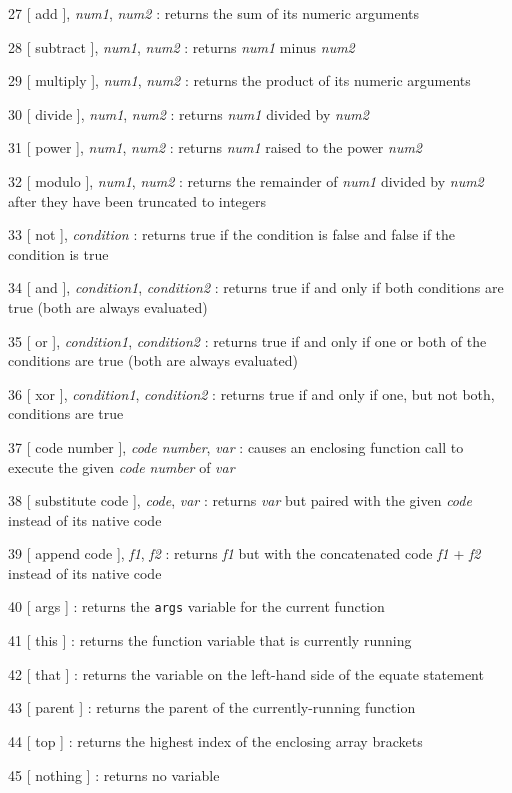 \documentclass{article}
\begin{document}
\begin{description}
\item{27  [ add ], \emph{num1}, \emph{num2}} : returns the sum of its numeric arguments
\item{28  [ subtract ], \emph{num1}, \emph{num2}} : returns \emph{num1} minus \emph{num2}
\item{29  [ multiply ], \emph{num1}, \emph{num2}} : returns the product of its numeric arguments
\item{30  [ divide ], \emph{num1}, \emph{num2}} : returns \emph{num1} divided by \emph{num2}
\item{31  [ power ], \emph{num1}, \emph{num2}} : returns \emph{num1} raised to the power \emph{num2}
\item{32  [ modulo ], \emph{num1}, \emph{num2}} : returns the remainder of \emph{num1} divided by \emph{num2} after they have been truncated to integers

\item{33  [ not ], \emph{condition}} : returns true if the condition is false and false if the condition is true
\item{34  [ and ], \emph{condition1}, \emph{condition2}} : returns true if and only if both conditions are true (both are always evaluated)
\item{35  [ or ], \emph{condition1}, \emph{condition2}} : returns true if and only if one or both of the conditions are true (both are always evaluated)
\item{36  [ xor ], \emph{condition1}, \emph{condition2}} : returns true if and only if one, but not both, conditions are true

\item{37  [  code number ], \emph{code number},  \emph{var}} : causes an enclosing function call to execute the given \emph{code number} of \emph{var}
\item{38  [ substitute code ], \emph{code},  \emph{var}} : returns \emph{var} but paired with the given \emph{code} instead of its native code
\item{39  [ append code ],  \emph{f1}, \emph{f2}} : returns \emph{f1} but with the concatenated code \emph{f1} + \emph{f2} instead of its native code

\item{40  [ args ]} : returns the \verb#args# variable for the current function
\item{41  [ this ]} : returns the function variable that is currently running
\item{42  [ that ]} : returns the variable on the left-hand side of the equate statement
\item{43  [ parent ]} : returns the parent of the currently-running function
\item{44  [ top ]} : returns the highest index of the enclosing array brackets
\item{45  [ nothing ]} : returns no variable


\end{description}
\end{document}
